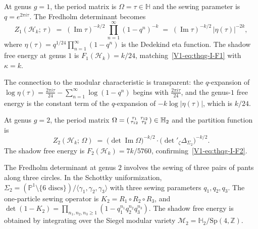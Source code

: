 \begin{example}
At genus $g = 1$, the period matrix is $\Omega = \tau \in \mathbb{H}$ and the sewing parameter is $q = e^{2\pi i\tau}$. The Fredholm determinant becomes
\begin{equation}%
Z_1(\mathcal{H}_k;\,\tau) \;=\; (\operatorname{Im}\tau)^{-k/2}\, \prod_{n=1}^{\infty} (1 - q^n)^{-k} \;=\; (\operatorname{Im}\tau)^{-k/2}\, \bigl|\eta(\tau)\bigr|^{-2k},
\end{equation}
where $\eta(\tau) = q^{1/24}\prod_{n=1}^{\infty}(1 - q^n)$ is the Dedekind eta function. The shadow free energy at genus $1$ is $F_1(\mathcal{H}_k) = k/24$, matching~\eqref{V1-eq:thqg-I-F1} with $\kappa = k$.

The connection to the modular characteristic is transparent: the $q$-expansion of $\log \eta(\tau) = \frac{2\pi i\tau}{24} - \sum_{n=1}^\infty \log(1-q^n)$ begins with $\frac{2\pi i \tau}{24}$, and the genus-$1$ free energy is the constant term of the $q$-expansion of $-k\log|\eta(\tau)|$, which is $k/24$.
\end{example}

\begin{example}
At genus $g = 2$, the period matrix $\Omega = \begin{psmallmatrix} \tau_1 & \tau_{12} \\ \tau_{12} & \tau_2 \end{psmallmatrix} \in \mathbb{H}_2$ and the partition function is
\begin{equation}%
Z_2(\mathcal{H}_k;\,\Omega) \;=\; \bigl(\det\operatorname{Im}\Omega\bigr)^{-k/2} \cdot \bigl(\det{}'_\zeta \Delta_{\Sigma_2}\bigr)^{-k/2}.
\end{equation}
The shadow free energy is $F_2(\mathcal{H}_k) = 7k/5760$, confirming~\eqref{V1-eq:thqg-I-F2}.

The Fredholm determinant at genus $2$ involves the sewing of three pairs of pants along three circles. In the Schottky uniformization, $\Sigma_2 = (\mathbb{P}^1 \setminus \{6 \text{ discs}\}) / \langle \gamma_1, \gamma_2, \gamma_3 \rangle$ with three sewing parameters $q_1, q_2, q_3$. The one-particle sewing operator is $K_2 = R_1 \circ R_2 \circ R_3$, and $\det(1 - K_2) = \prod_{n_1,n_2,n_3 \geq 1} (1 - q_1^{n_1} q_2^{n_2} q_3^{n_3})$. The shadow free energy is obtained by integrating over the Siegel modular variety $\mathcal{M}_2 = \mathbb{H}_2 / \mathrm{Sp}(4,\mathbb{Z})$.
\end{example}

